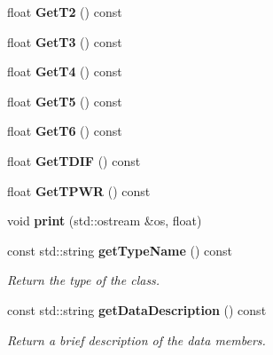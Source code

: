 \begin{DoxyCompactItemize}
\item 
float {\bfseries GetT2} () const \label{classCALICE_1_1TempSensorBlockOld_a4663dda7309826ace2cf5bd61b67e5e0}

\item 
float {\bfseries GetT3} () const \label{classCALICE_1_1TempSensorBlockOld_af4a3ebf85837357ca3f779c4f76aec2a}

\item 
float {\bfseries GetT4} () const \label{classCALICE_1_1TempSensorBlockOld_a9d33ccb66b6ecc6fd9b09dc3ec74b05e}

\item 
float {\bfseries GetT5} () const \label{classCALICE_1_1TempSensorBlockOld_aa3e9bc414a3bb44caf97fcc815417790}

\item 
float {\bfseries GetT6} () const \label{classCALICE_1_1TempSensorBlockOld_af20c1b20fbd07c01f80ce2e9ad1ec03b}

\item 
float {\bfseries GetTDIF} () const \label{classCALICE_1_1TempSensorBlockOld_a5b6390ec23ce91e080f94188ecf2708f}

\item 
float {\bfseries GetTPWR} () const \label{classCALICE_1_1TempSensorBlockOld_a71713df3906fbd95f628d58d53c233f7}

\item 
void {\bfseries print} (std::ostream \&os, float)\label{classCALICE_1_1TempSensorBlockOld_afbe6d02c5fa6af5dedc8269ac47d3e53}

\item 
const std::string {\bf getTypeName} () const \label{classCALICE_1_1TempSensorBlockOld_aeeed0bef453e6e628add8cdc206febc0}

\begin{DoxyCompactList}\small\item\em Return the type of the class. \item\end{DoxyCompactList}\item 
const std::string {\bf getDataDescription} () const \label{classCALICE_1_1TempSensorBlockOld_a1a0946cac03450c5f658780aee2c3ee6}

\begin{DoxyCompactList}\small\item\em Return a brief description of the data members. \item\end{DoxyCompactList}\end{DoxyCompactItemize}


